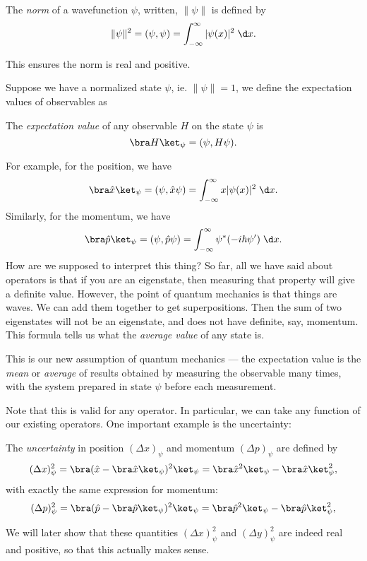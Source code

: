 \documentclass[a4paper]{article}
\begin{document}
\begin{defi}[Norm]
  The \emph{norm} of a wavefunction $\psi$, written, $\|\psi\|$ is defined by
  \[
    \|\psi\|^2 = (\psi, \psi) = \int_{-\infty}^\infty |\psi(x)|^2\;\d x.
  \]
\end{defi}
This ensures the norm is real and positive.

Suppose we have a normalized state $\psi$, ie. $\|\psi\| = 1$, we define the expectation values of observables as
\begin{defi}
  The \emph{expectation value} of any observable $H$ on the state $\psi$ is
  \[
    \bra H \ket_\psi = (\psi, H\psi).
  \]
\end{defi}
For example, for the position, we have
\[
  \bra \hat{x} \ket_\psi = (\psi, \hat{x}\psi) = \int_{-\infty}^\infty x|\psi(x)|^2 \;\d x.
\]
Similarly, for the momentum, we have
\[
  \bra \hat{p} \ket_{\psi} = (\psi, \hat{p}\psi) = \int_{-\infty}^\infty \psi^* (-i\hbar \psi')\;\d x.
\]
How are we supposed to interpret this thing? So far, all we have said about operators is that if you are an eigenstate, then measuring that property will give a definite value. However, the point of quantum mechanics is that things are waves. We can add them together to get superpositions. Then the sum of two eigenstates will not be an eigenstate, and does not have definite, say, momentum. This formula tells us what the \emph{average value} of any state is.

This is our new assumption of quantum mechanics --- the expectation value is the \emph{mean} or \emph{average} of results obtained by measuring the observable many times, with the system prepared in state $\psi$ before each measurement.

Note that this is valid for any operator. In particular, we can take any function of our existing operators. One important example is the uncertainty:
\begin{defi}[Uncertainty]
  The \emph{uncertainty} in position $(\Delta x)_\psi$ and momentum $(\Delta p)_\psi$ are defined by
  \[
    (\Delta x)_\psi^2 = \bra (\hat{x} - \bra \hat{x}\ket_\psi)^2 \ket_\psi = \bra \hat{x}^2\ket_\psi - \bra \hat{x}\ket^2_\psi,
  \]
  with exactly the same expression for momentum:
  \[
    (\Delta p)_\psi^2 = \bra (\hat{p} - \bra \hat{p}\ket_\psi)^2 \ket_\psi = \bra \hat{p}^2\ket_\psi - \bra \hat{p}\ket^2_\psi,
  \]
\end{defi}
We will later show that these quantities $(\Delta x)_\psi^2$ and $(\Delta y)_\psi^2$ are indeed real and positive, so that this actually makes sense.
\end{document}
